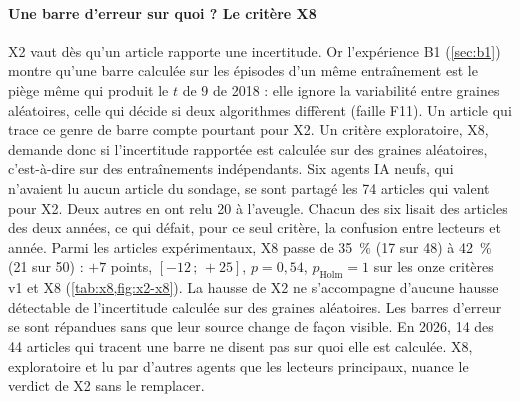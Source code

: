 \paragraph{Une barre d'erreur sur quoi ? Le critère X8}
X2 vaut  dès qu'un article rapporte une incertitude. Or l'expérience B1 (\cref{sec:b1}) montre qu'une
barre calculée sur les épisodes d'un même entraînement est le piège même qui produit le $t$ de 9 de 2018 : elle
ignore la variabilité entre graines aléatoires, celle qui décide si deux algorithmes diffèrent (faille F11). Un
article qui trace ce genre de barre compte pourtant  pour X2. Un critère exploratoire, X8,
demande donc si l'incertitude rapportée est calculée sur des graines aléatoires, c'est-à-dire sur des
entraînements indépendants. Six agents IA neufs, qui n'avaient lu aucun article du
sondage, se sont partagé les 74 articles qui valent  pour X2. Deux autres en ont relu 20 à
l'aveugle. Chacun des six lisait des articles des deux années, ce qui défait, pour ce seul critère, la confusion entre lecteurs et année. Parmi les articles expérimentaux, X8
passe de 35~\% (17 sur 48) à 42~\% (21 sur 50) : $+7$ points, $[-12\,;\,+25]$, $p = 0{,}54$,
$p_{\text{Holm}} = 1$ sur les onze critères v1 et X8 (\cref{tab:x8,fig:x2-x8}). La hausse de X2 ne s'accompagne d'aucune hausse détectable de l'incertitude
calculée sur des graines aléatoires. Les barres d'erreur se sont répandues sans que leur source change de façon
visible. En 2026, 14 des 44 articles qui tracent une barre ne disent pas sur quoi elle est calculée. X8,
exploratoire et lu par d'autres agents que les lecteurs principaux, nuance le verdict de X2 sans le
remplacer.



